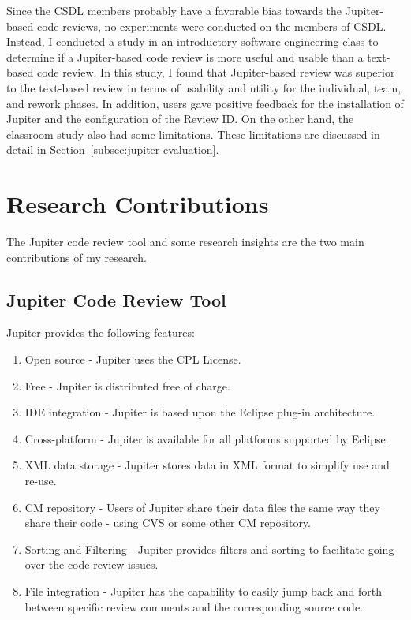 Since the CSDL members probably have a favorable bias towards the Jupiter-based code reviews, no experiments were conducted on the members of CSDL. Instead, I conducted a study in an introductory software engineering class to determine if a Jupiter-based code review is more useful and usable than a text-based code review. In this study, I found that Jupiter-based review was superior to the text-based review in terms of usability and utility for the individual, team, and rework phases. In addition, users gave positive feedback for the installation of Jupiter and the configuration of the Review ID. On the other hand, the classroom study also had some limitations. These limitations are discussed in detail in Section~\ref{subsec:jupiter-evaluation}.

\section{Research Contributions}
\label{sec:research-contributions}

The Jupiter code review tool and some research insights are the two main contributions of my research.

\subsection{Jupiter Code Review Tool}
\label{subsec:jupiter-code-review-tool}

Jupiter provides the following features:

\begin{enumerate}
	\item Open source - Jupiter uses the CPL License.
	\item Free - Jupiter is distributed free of charge.
	\item IDE integration - Jupiter is based upon the Eclipse plug-in architecture.
	\item Cross-platform - Jupiter is available for all platforms supported by Eclipse.
	\item XML data storage - Jupiter stores data in XML format to simplify use and re-use.
	\item CM repository - Users of Jupiter share their data files the same way they share their code - using CVS or some other CM repository.
	\item Sorting and Filtering - Jupiter provides filters and sorting to facilitate going over the code review issues.
	\item File integration - Jupiter has the capability to easily jump back and forth between specific review comments and the corresponding source code.
\end{enumerate}

